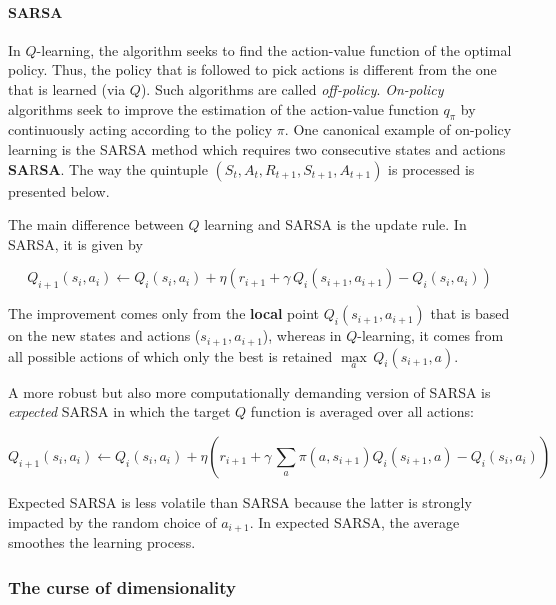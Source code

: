 \paragraph{SARSA}

In $Q$-learning, the algorithm seeks to find the action-value function of the optimal policy. Thus, the policy that is followed to pick actions is different from the one that is learned (via $Q$). Such algorithms are called \textit{off-policy}. \textit{On-policy} algorithms seek to improve the estimation of the action-value function $q_\pi$ by continuously acting according to the policy $\pi$. One canonical example of on-policy learning is the SARSA method which requires two consecutive states and actions \textbf{SA}R\textbf{SA}. The way the quintuple $(S_t,A_t,R_{t+1}, S_{t+1}, A_{t+1})$ is processed is presented below.

The main difference between $Q$ learning and SARSA is the update rule. In SARSA, it is given by

\begin{equation}
\label{eq-SARSAupdate}
Q_{i+1}(s_i,a_i) \longleftarrow Q_i(s_i,a_i) + \eta  \left(r_{i+1}+\gamma \, Q_i(s_{i+1},a_{i+1})-Q_i(s_i,a_i) \right)
\end{equation}

The improvement comes only from the \textbf{local} point $Q_i(s_{i+1},a_{i+1})$ that is based on the new states and actions ($s_{i+1},a_{i+1}$), whereas in $Q$-learning, it comes from all possible actions of which only the best is retained $\underset{a}{\max} \, Q_i(s_{i+1},a)$.

A more robust but also more computationally demanding version of SARSA is \textit{expected} SARSA in which the target $Q$ function is averaged over all actions:

\begin{equation}
\label{eq-exSARSAupdate}
Q_{i+1}(s_i,a_i) \longleftarrow Q_i(s_i,a_i) + \eta  \left(r_{i+1}+\gamma \, \sum_a \pi(a,s_{i+1}) Q_i(s_{i+1},a) -Q_i(s_i,a_i) \right)
\end{equation}

Expected SARSA is less volatile than SARSA because the latter is strongly impacted by the random choice of $a_{i+1}$. In expected SARSA, the average smoothes the learning process.

\subsubsection{The curse of dimensionality}

